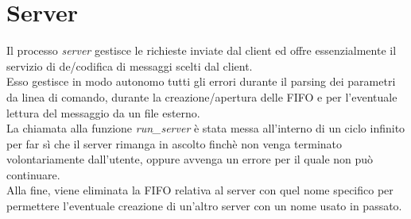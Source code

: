 \documentclass[a4paper,10pt]{article}
\begin{document}
\section{Server}
Il processo \emph{server} gestisce le richieste inviate dal client ed offre essenzialmente il servizio di de/codifica di messaggi scelti dal client.\\
Esso gestisce in modo autonomo tutti gli errori durante il parsing dei parametri da linea di comando, durante la creazione/apertura delle FIFO e per l'eventuale lettura del messaggio da un file esterno.\\
La chiamata alla funzione \emph{run\_server} è stata messa all'interno di un ciclo infinito per far sì che il server rimanga in ascolto finchè non venga terminato volontariamente dall'utente, oppure avvenga un errore per il quale non può continuare.\\
Alla fine, viene eliminata la FIFO relativa al server con quel nome specifico per permettere l'eventuale creazione di un'altro server con un nome usato in passato.
\end{document}
